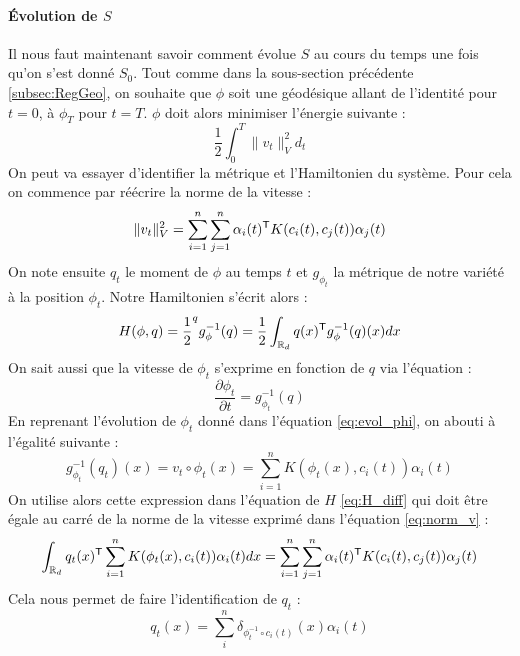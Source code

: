 \paragraph{Évolution de $S$}
Il nous faut maintenant savoir comment évolue $S$ au cours du temps une fois qu'on s'est donné $S_0$. Tout comme dans la sous-section précédente \ref{subsec:RegGeo}, on souhaite que $\phi$ soit une géodésique allant de l'identité pour $t=0$, à $\phi_T$ pour $t=T$. $\phi$ doit alors minimiser l'énergie suivante :
\begin{equation}
	\frac{1}{2} \int_0^T \| v_t \|_V^2 d_t
\end{equation}
On peut va essayer d'identifier la métrique et l'Hamiltonien du système. Pour cela on commence par réécrire la norme de la vitesse :
\begin{equation}
	\label{eq:norm_v}
	\| v_t \|_V^2 = \sum_{i=1}^n \sum_{j=1}^n \alpha_i(t)^{\mathsf{T}} K(c_i(t), c_j(t)) \alpha_j(t)
\end{equation}
On note ensuite $q_t$ le moment de $\phi$ au temps $t$ et $g_{\phi_t}$ la métrique de notre variété à la position $\phi_t$. Notre Hamiltonien s'écrit alors :
\begin{equation}
	\label{eq:H_diff}
	H(\phi, q) = \frac{1}{2} \sp{q}{g_\phi^{-1}(q)} = \frac{1}{2} \int_{\mathbb{R}_d} q(x)^{\mathsf{T}} g_\phi^{-1}(q)(x) dx
\end{equation}
On sait aussi que la vitesse de $\phi_t$ s'exprime en fonction de $q$ via l'équation :
\begin{equation}
	\frac{\partial \phi_t}{\partial t} = g_{\phi_t}^{-1}(q)
\end{equation}
En reprenant l'évolution de $\phi_t$ donné dans l'équation \eqref{eq:evol_phi}, on abouti à l'égalité suivante :
\begin{equation}
	\label{eq:inv_g_q}
	g_{\phi_t}^{-1}(q_t)(x) = v_t \circ \phi_t(x) = \sum_{i=1}^n K(\phi_t(x), c_i(t)) \alpha_i(t)
\end{equation}
On utilise alors cette expression dans l'équation de $H$ \eqref{eq:H_diff} qui doit être égale au carré de la norme de la vitesse exprimé dans l'équation \eqref{eq:norm_v} :
\begin{equation}
	\int_{\mathbb{R}_d} q_t(x)^{\mathsf{T}} \sum_{i=1}^n K(\phi_t(x), c_i(t)) \alpha_i(t) dx = \sum_{i=1}^n \sum_{j=1}^n \alpha_i(t)^{\mathsf{T}} K(c_i(t), c_j(t)) \alpha_j(t)
\end{equation}
Cela nous permet de faire l'identification de $q_t$ :
\begin{equation}
	\label{eq:q_t}
	q_t(x) = \sum_{i}^n \delta_{\phi_t^{-1} \circ c_i(t)}(x) \alpha_i(t)
\end{equation}
